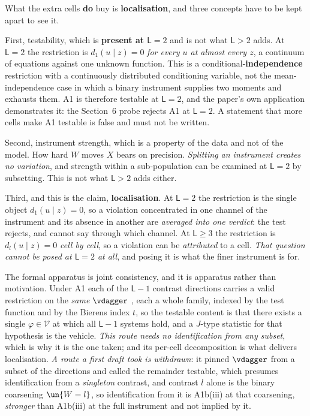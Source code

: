 What the extra cells \textbf{do} buy is \textbf{localisation}, and three concepts have to be kept
apart to see it.

First, testability, which is \textbf{present at $\mathsf L=2$} and is not what $\mathsf L>2$ adds.
At $\mathsf L=2$ the restriction is $d_1(u\mid z)=0$ \emph{for every $u$ at almost every $z$}, a
continuum of equations against one unknown function. This is a conditional-\textbf{independence}
restriction with a continuously distributed conditioning variable, not the mean-independence case in
which a binary instrument supplies two moments and exhausts them. A1 is therefore testable at
$\mathsf L=2$, and the paper's own application demonstrates it: the Section~6 probe rejects A1 at
$\mathsf L=2$. A statement that more cells make A1 testable is false and must not be written.

Second, instrument strength, which is a property of the data and not of the model. How hard $W$
moves $X$ bears on precision. \emph{Splitting an instrument creates no variation}, and strength within a
sub-population can be examined at $\mathsf L=2$ by subsetting. This is not what $\mathsf L>2$ adds
either.

Third, and this is the claim, \textbf{localisation}. At $\mathsf L=2$ the restriction is the
single object $d_1(u\mid z)=0$, so a violation concentrated in one channel of the instrument and its
absence in another are \emph{averaged into one verdict}: the test rejects, and cannot say through which
channel. At $\mathsf L\ge3$ the restriction is $d_l(u\mid z)=0$ \emph{cell by cell}, so a violation can be
\emph{attributed} to a cell. \emph{That question cannot be posed at $\mathsf L=2$ at all}, and posing it
is what the finer instrument is for.

The formal apparatus is joint consistency, and it is apparatus rather than motivation. Under A1
each of the $\mathsf L-1$ contrast directions carries a valid restriction on the \emph{same} $\vdagger$
, each a whole family, indexed by the test function and by the Bierens index $t$, so the testable
content is that there exists a single $\varphi\in\mathcal V$ at which all $\mathsf L-1$ systems hold, and
a $J$-type statistic for that hypothesis is the vehicle. \emph{This route needs no identification from
any subset}, which is why it is the one taken; and its per-cell decomposition is what delivers
localisation. \emph{A route a first draft took is withdrawn}: it pinned $\vdagger$ from a subset of the
directions and called the remainder testable, which presumes identification from a \emph{singleton}
contrast, and contrast $l$ alone is the binary coarsening $\un\{W=l\}$, so identification from it is
A1b(iii) at that coarsening, \emph{stronger} than A1b(iii) at the full instrument and not implied by it.

